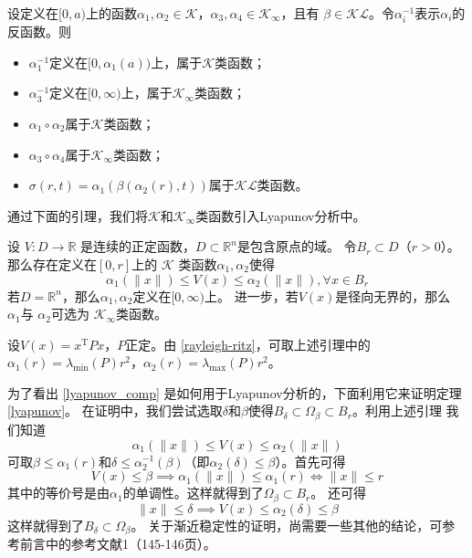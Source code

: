 \begin{lemma}
  设定义在$[0,a)$上的函数$\alpha_{1},\alpha_{2}\in\mathcal{K}$，$\alpha_{3},\alpha_{4}\in\mathcal{K}_{\infty}$，且有
  $\beta\in\mathcal{KL}$。令$\alpha_{i}^{-1}$表示$\alpha_{i}$的反函数。则
  \begin{itemize}[leftmargin=1em]
    \item $\alpha_{1}^{-1}$定义在$[0,\alpha_{1}(a))$上，属于$\mathcal{K}$类函数；
    \item $\alpha_{3}^{-1}$定义在$[0,\infty)$上，属于$\mathcal{K}_\infty$类函数；
    \item $\alpha_{1} \circ\alpha_{2}$属于$\mathcal{K}$类函数；
    \item $\alpha_{3} \circ\alpha_{4}$属于$\mathcal{K}_\infty$类函数；
    \item $\sigma(r,t)=\alpha_{1}(\beta(\alpha_{2}(r),t)) $属于$\mathcal{K}\mathcal{L}$类函数。
  \end{itemize}
\end{lemma}

通过下面的引理，我们将$\mathcal{K}$和$\mathcal{K}_\infty$类函数引入Lyapunov分析中。

\begin{lemma}\label{lyapunov_comp}
 设 $V : D \rightarrow \mathbb{R}$ 是连续的正定函数，$D\subset\mathbb{R}^n$是包含原点的域。
  令$B_r\subset D$（$r>0$）。那么存在定义在$[0,r]$上的
  $\mathcal{K}$ 类函数$\alpha_1,\alpha_2$使得
  \[ \alpha_1 (\| x \|) \leq V (x) \leq \alpha_2 (\| x \|), \forall x \in B_r \]
  若$D =\mathbb{R}^n$，那么$\alpha_1,\alpha_2$定义在$[0,\infty)$上。
  进一步，若$V(x)$是径向无界的，那么 $\alpha_1$与 $\alpha_2$可选为 $\mathcal{K}_{\infty}$类函数。
\end{lemma}

\begin{example}
  设$V (x) = x^\mathrm{T} P  x$，$P$正定。由 \ref{rayleigh-ritz}，可取上述引理中的$\alpha_1(r)=\lambda_{\min} (P)r^2$，$\alpha_2(r)=\lambda_{\max} (P)r^2$。
\end{example}
为了看出 \ref{lyapunov_comp} 是如何用于Lyapunov分析的，下面利用它来证明定理 \ref{lyapunov}。
在证明中，我们尝试选取$\delta$和$\beta$使得$B_\delta\subset\Omega_\beta\subset B_r$。利用上述引理
我们知道\[\alpha_1 (\| x \|) \leq V (x) \leq \alpha_2 (\| x \|)\]
可取$\beta\le\alpha_1(r)$和$\delta\le\alpha_2^{-1}(\beta)$（即$\alpha_2(\delta)\le\beta$）。首先可得
\[V(x)\le\beta\implies\alpha_1(\|x\|)\le\alpha_1(r)\iff \|x\|\le r\]
其中的等价号是由$\alpha_1$的单调性。这样就得到了$\Omega_\beta\subset B_r$。
还可得\[\|x\|\le\delta\implies V(x)\le\alpha_2(\delta)\le\beta\]
这样就得到了$B_\delta\subset\Omega_\beta$。
关于渐近稳定性的证明，尚需要一些其他的结论，可参考前言中的参考文献1（145-146页）。

